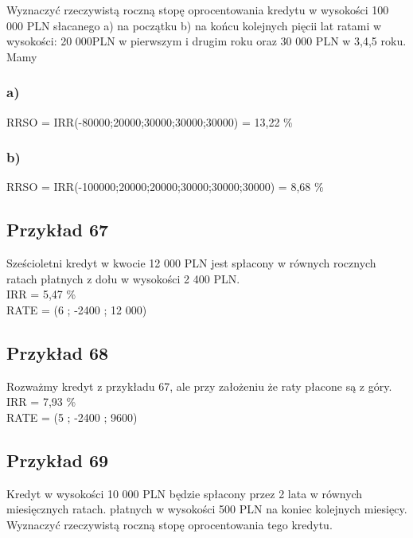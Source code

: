 \documentclass{article}
\begin{document}
Wyznaczyć rzeczywistą roczną stopę oprocentowania kredytu w wysokości 100 000 PLN słacanego a) na początku b) na końcu kolejnych pięcii lat ratami w wysokości: 20 000PLN w pierwszym i drugim roku oraz 30 000 PLN w 3,4,5 roku.\\

Mamy\\

\subsubsection{a)}

RRSO = IRR(-80000;20000;30000;30000;30000) = 13,22 \%

\subsubsection{b)}

RRSO = IRR(-100000;20000;20000;30000;30000;30000) = 8,68 \%

\subsection{Przykład 67}

Sześcioletni kredyt w kwocie 12 000 PLN jest spłacony w równych rocznych ratach płatnych z dołu w wysokości 2 400 PLN.\\

IRR = 5,47 \%\\

RATE = (6 ; -2400 ; 12 000)\\

\subsection{Przykład 68}

Rozważmy kredyt z przykładu 67, ale przy założeniu że raty płacone są z góry.\\

IRR = 7,93 \% \\

RATE = (5 ; -2400 ; 9600)\\

\subsection{Przykład 69}

Kredyt w wysokości 10 000 PLN będzie spłacony przez 2 lata w równych miesięcznych ratach. płatnych w wysokości 500 PLN na koniec kolejnych miesięcy. Wyznaczyć rzeczywistą roczną stopę oprocentowania tego kredytu.\\
\end{document}
